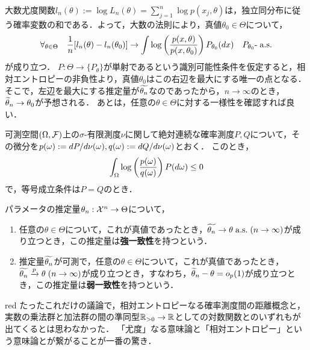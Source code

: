 \documentclass[uplatex,dvipdfmx]{jsreport}
\begin{document}
\begin{remarks}[最尤推定量の一致性]\label{remarks-consistency-of-MLE}
    大数尤度関数$l_n(\theta):=\log L_n(\theta)=\sum_{j=1}^n\log p(x_j,\theta)$は，独立同分布に従う確率変数の和である．よって，大数の法則により，真値$\theta_0\in\Theta$について，
    \[\forall_{\theta\in\Theta}\quad\frac{1}{n}[l_n(\theta)-l_n(\theta_0)]\to\int\log\left(\frac{p(x,\theta)}{p(x,\theta_0)}\right)P_{\theta_0}(dx)\quad P_{\theta_0}\text{-}\;\mathrm{a.s.}\]
    が成り立つ．
    $P:\Theta\to\{P_\theta\}$が単射であるという識別可能性条件を仮定すると，相対エントロピーの非負性より，真値$\theta_0$はこの右辺を最大にする唯一の点となる．
    そこで，左辺を最大にする推定量が$\widetilde{\theta_n}$なのであったから，$n\to\infty$のとき，$\widetilde{\theta}_n\to\theta_0$が予想される．
    あとは，任意の$\theta\in\Theta$に対する一様性を確認すれば良い．
\end{remarks}

\begin{lemma}
    可測空間$(\Omega,\mathcal{F})$上の$\sigma$-有限測度$\nu$に関して絶対連続な確率測度$P,Q$について，その微分を$p(\omega):=dP/d\nu(\omega),q(\omega):=dQ/d\nu(\omega)$とおく．
    このとき，
    \[\int_\Omega\log\left(\frac{p(\omega)}{q(\omega)}\right)P(d\omega)\le 0\]
    で，等号成立条件は$P=Q$のとき．
\end{lemma}

\begin{definition}[consistency]
    パラメータの推定量$\theta_n:\mathcal{X}^n\to\Theta$について，
    \begin{enumerate}
        \item 任意の$\theta\in\Theta$について，これが真値であったとき，$\widetilde{\theta_n}\to\theta\;\mathrm{a.s.}\;(n\to\infty)$が成り立つとき，この推定量は\textbf{強一致性}を持つという．
        \item 推定量$\widetilde{\theta_n}$が可測で，任意の$\theta\in\Theta$について，これが真値であったとき，$\widetilde{\theta_n}\xrightarrow{p}\theta\;(n\to\infty)$が成り立つとき，すなわち，$\widetilde{\theta}_n-\theta=o_p(1)$が成り立つとき，この推定量は\textbf{弱一致性}を持つという．
    \end{enumerate}
\end{definition}

\begin{tbox}{red}{}
    たったこれだけの議論で，相対エントロピーなる確率測度間の距離概念と，実数の乗法群と加法群の間の準同型$\mathbb{R}_{>0}\to\mathbb{R}$としての対数関数とのいずれもが出てくるとは思わなかった．
    「尤度」なる意味論と「相対エントロピー」という意味論とが繋がることが一番の驚き．
\end{tbox}
\end{document}
